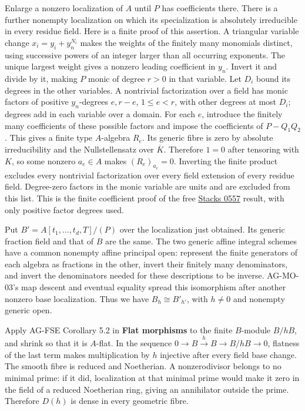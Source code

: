 \documentclass[11pt,a4paper,openany]{report}
\newcounter{none}
\begin{document}
Enlarge a nonzero localization of \(A\) until \(P\) has coefficients there. There is a further nonempty localization on which its specialization is absolutely irreducible in every residue field. Here is a finite proof of this assertion. A triangular variable change \(x_i=y_i+y_n^{N_i}\) makes the weights of the finitely many monomials distinct, using successive powers of an integer larger than all occurring exponents. The unique largest weight gives a nonzero leading coefficient in \(y_n\). Invert it and divide by it, making \(P\) monic of degree \(r>0\) in that variable. Let \(D_i\) bound its degrees in the other variables. A nontrivial factorization over a field has monic factors of positive \(y_n\)-degrees \(e,r-e\), \(1\leq e<r\), with other degrees at most \(D_i\); degrees add in each variable over a domain. For each \(e\), introduce the finitely many coefficients of these possible factors and impose the coefficients of \(P-Q_1Q_2\). This gives a finite type \(A\)-algebra \(R_e\). Its generic fibre is zero by absolute irreducibility and the Nullstellensatz over \(\overline K\). Therefore \(1=0\) after tensoring with \(K\), so some nonzero \(a_e\in A\) makes \((R_e)_{a_e}=0\). Inverting the finite product excludes every nontrivial factorization over every field extension of every residue field. Degree-zero factors in the monic variable are units and are excluded from this list. This is the finite coefficient proof of the free \href{https://stacks.math.columbia.edu/tag/0557}{Stacks 0557} result, with only positive factor degrees used.

Put \(B'=A[t_1,\ldots,t_d,T]/(P)\) over the localization just obtained. Its generic fraction field and that of \(B\) are the same. The two generic affine integral schemes have a common nonempty affine principal open: represent the finite generators of each algebra as fractions in the other, invert their finitely many denominators, and invert the denominators needed for these descriptions to be inverse. AG-MO-03's map descent and eventual equality spread this isomorphism after another nonzero base localization. Thus we have \(B_h\cong B'_{h'}\), with \(h\ne0\) and nonempty generic open.

Apply AG-FSE Corollary 5.2 in \textbf{Flat morphisms} to the finite \(B\)-module \(B/hB\), and shrink so that it is \(A\)-flat. In the sequence \(0\to B\xrightarrow{h}B\to B/hB\to0\), flatness of the last term makes multiplication by \(h\) injective after every field base change. The smooth fibre is reduced and Noetherian. A nonzerodivisor belongs to no minimal prime: if it did, localization at that minimal prime would make it zero in the field of a reduced Noetherian ring, giving an annihilator outside the prime. Therefore \(D(h)\) is dense in every geometric fibre.
\end{document}
